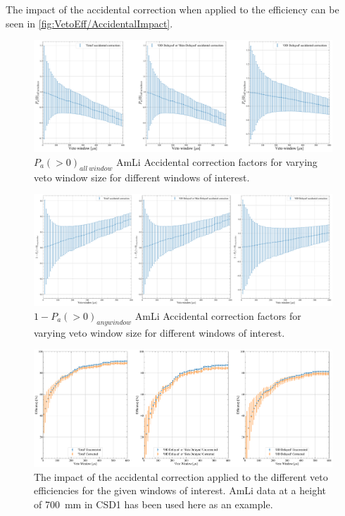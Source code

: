 The impact of the accidental correction when applied to the efficiency can be seen in \autoref{fig:VetoEff/AccidentalImpact}.
\begin{figure}
	\centering
	\includegraphics[width=\textwidth]{figures/VetoEfficiency/SR3AmLi_700_Corrections_100k_P0.pdf}
	\caption{$P_a(>0)_{all\:window}$ AmLi Accidental correction factors for varying veto window size for different windows of interest.}
	\label{fig:VetoEff/AccCorr}
\end{figure}
\begin{figure}
	\centering
	\includegraphics[width=\textwidth]{figures/VetoEfficiency/SR3AmLi_700_Corrections_100k_P0-1.pdf}
	\caption{$1 - P_a(>0)_{any window}$ AmLi Accidental correction factors for varying veto window size for different windows of interest.}
	\label{fig:VetoEff/AccCorr_P0-1}
\end{figure}
\begin{figure}
	\centering
	\includegraphics[width=\textwidth]{figures/VetoEfficiency/AccidentalCorrectionImpact.pdf}
	\caption{The impact of the accidental correction applied to the different veto efficiencies for the given windows of interest. AmLi data at a height of 700~mm in CSD1 has been used here as an example.}
	\label{fig:VetoEff/AccidentalImpact}
\end{figure}


